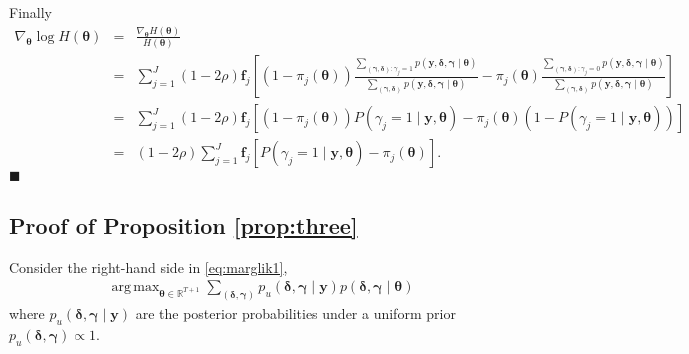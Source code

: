 \documentclass[12pt]{article}
\newcommand{\mb}[1]{\mathbf{#1}}
\DeclareMathOperator*{\argmax}{arg\,max}
\newcommand{\by}{{\mb{y}}}
\newcommand{\bgamma}{{\bm{\gamma}}}
\newcommand{\bdelta}{{\bm{\delta}}}
\newcommand{\btheta}{{\bm{\theta}}}
\begin{document}
Finally
\begin{eqnarray}
\nabla_{\btheta} \log H(\btheta) &=& \frac{\nabla_{\btheta} H(\btheta)}{H(\btheta)} \nonumber \\
&=& \sum_{j=1}^{J} (1-2\rho) \mb{f}_{j} \left[ (1-\pi_{j}(\btheta)) \frac{\sum_{(\bgamma, \bdelta): \gamma_{j}=1} p(\by, \bdelta, \bgamma \mid \btheta)}{\sum_{(\bgamma, \bdelta)} p(\by, \bdelta, \bgamma \mid \btheta)} - \pi_{j}(\btheta) \frac{\sum_{(\bgamma, \bdelta): \gamma_{j}=0} p(\by, \bdelta, \bgamma \mid \btheta)}{\sum_{(\bgamma, \bdelta)} p(\by, \bdelta, \bgamma \mid \btheta)} \right] \nonumber \\
&=& \sum_{j=1}^{J} (1-2\rho) \mb{f}_{j} \left[ (1-\pi_{j}(\btheta)) P(\gamma_{j} = 1 \mid \by, \btheta) - \pi_{j}(\btheta) (1 - P(\gamma_{j} = 1 \mid \by, \btheta)) \right] \nonumber \\
&=& (1-2\rho) \sum_{j=1}^{J} \mb{f}_{j} \left[ P(\gamma_{j} = 1 \mid \by, \btheta) - \pi_{j}(\btheta) \right]. \nonumber
\end{eqnarray}
\hfill $\blacksquare$

\subsection{Proof of Proposition \ref{prop:three}}  \label{sec:proof_prop3}

Consider the right-hand side in \eqref{eq:marglik1},
\begin{align}
\argmax_{\btheta \in \mathbb{R}^{T+1}} \sum_{(\bdelta, \bgamma)} p_{u}(\bdelta, \bgamma \mid \by) p(\bdelta, \bgamma \mid \btheta)
\label{eq:l1eq1}
\end{align}
where $p_{u}(\bdelta, \bgamma \mid \by)$ are the posterior probabilities under a uniform prior $p_{u}(\bdelta, \bgamma) \propto 1$.
\end{document}

